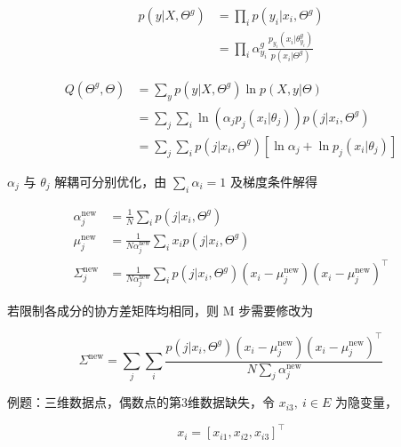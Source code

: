 \documentclass[openany,a4paper,12pt]{ctexbook}
\theoremstyle{kaiti}
\theoremstyle{normal}
\begin{document}
\begin{equation}
\begin{aligned}
  p\left(y|X,\Theta ^g \right)
  &=\prod_ip\left(y_i|x_i,\Theta ^g \right)\\
  &=\prod_i\alpha_{y_i}^{g}\frac{p_{y_i}\left(x_i|\theta_{y_i}^{g} \right)}{p\left(x_i|\Theta ^g \right)}
\end{aligned}
\end{equation}

\begin{equation}
\begin{aligned}
  Q\left(\Theta ^g,\Theta \right)
  &=\sum_yp\left(y|X,\Theta ^g \right)\ln p\left(X,y|\Theta \right)\\
  &=\sum_j\sum_i\ln \left(\alpha_jp_j\left(x_i|\theta_j \right)\right)p\left(j|x_i,\Theta ^g \right)\\
  &=\sum_j\sum_ip\left(j|x_i,\Theta ^g \right)\left[\ln \alpha_j+\ln p_j\left(x_i|\theta_j \right)\right]
\end{aligned}
\end{equation}

$\alpha_j$ 与 $\theta_j$ 解耦可分别优化，由 $\sum_i\alpha_i=1$ 及梯度条件解得

\begin{equation}
\begin{aligned}
  \alpha_{j}^{\mathrm{new}}&=\frac{1}{N}\sum_ip\left(j|x_i,\Theta ^g \right)\\ 
  \mu_{j}^{\mathrm{new}}&=\frac{1}{N\alpha_{j}^{\mathrm{new}}}\sum_ix_ip\left(j|x_i,\Theta ^g \right)\\
  \Sigma_{j}^{\mathrm{new}}&=\frac{1}{N\alpha_{j}^{\mathrm{new}}}\sum_ip\left(j|x_i,\Theta ^g \right)\left(x_i-\mu_{j}^{\mathrm{new}} \right)\left(x_i-\mu_{j}^{\mathrm{new}} \right)^{\top}
\end{aligned}
\end{equation}

若限制各成分的协方差矩阵均相同，则 M 步需要修改为

\begin{equation}
\Sigma ^{\mathrm{new}}=\sum_{j}\sum_i\frac{p\left(j|x_i,\Theta ^g \right)\left(x_i-\mu_{j}^{\mathrm{new}} \right)\left(x_i-\mu_{j}^{\mathrm{new}} \right)^{\top}}{N\sum_j\alpha_{j}^{\mathrm{new}}}
\end{equation}

例题：三维数据点，偶数点的第3维数据缺失，令 $x_{i3},~i\in E$ 为隐变量，

\begin{equation}
x_i=\left[x_{i1},x_{i2},x_{i3} \right] ^{\top}
\end{equation}
\end{document}

